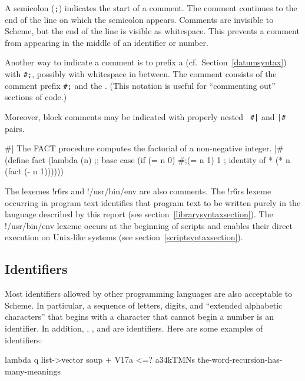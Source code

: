 A semicolon ({\tt;}) indicates the start of a
comment.\mainschindex{;}  The comment continues to the
end of the line on which the semicolon appears.  Comments are invisible
to Scheme, but the end of the line is visible as whitespace.  This
prevents a comment from appearing in the middle of an identifier or
number.

Another way to indicate a comment is to prefix a  (cf.\
Section~\ref{datumsyntax}) with {\tt \#;}, possibly with whitespace in
between.  The comment consists of the comment prefix {\tt \#;} and the
\hyper{S-expression}.  (This notation is useful for ``commenting out''
sections of code.)

Moreover, block comments may be indicated with properly nested {\tt
  \#|} and {\tt |\#} pairs.

\begin{scheme}
\#|
   The FACT procedure computes the factorial
   of a non-negative integer.
|\#
(define fact
  (lambda (n)
    ;; base case
    (if (= n 0)
        \#;(= n 1)
        1       ; identity of *
        (* n (fact (- n 1))))))%
\end{scheme}

The lexemes {\cf \sharpsign{}!r6rs} and {\cf \sharpsign{}!/usr/bin/env}
are also comments.  The {\cf \sharpsign{}!r6rs} lexeme occurring in
program text identifies that program text to be written purely in the
language described by this report (see
section~\ref{librarysyntaxsection}).  The {\cf
  \sharpsign{}!/usr/bin/env} lexeme occurs at the beginning of scripts
and enables their direct execution on Unix-like systems (see
section~\ref{scriptsyntaxsection}).

\subsection{Identifiers}
\label{identifiersection}

Most identifiers allowed by other programming
languages are also acceptable to Scheme.  In particular,
a sequence of letters, digits, and ``extended alphabetic
characters'' that begins with a character that cannot begin a number is
an identifier.  In addition, \ide{+}, \ide{-}, and \ide{...} are identifiers. 
Here are some examples of identifiers:

\begin{scheme}
lambda                   q
list->vector             soup
{+}                        V17a
<=?                      a34kTMNs
the-word-recursion-has-many-meanings%
\end{scheme}

